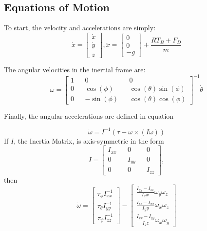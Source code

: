 \documentclass[12pt]{article}
\begin{document}
\subsection{Equations of Motion}
To start, the velocity and accelerations are simply:
\begin{equation}
\dot{x} = \begin{bmatrix} \dot{x}\\ \dot{y} \\ \dot{z} \end{bmatrix}, 
\ddot{x} =  \begin{bmatrix} 0\\0\\-g \end{bmatrix} + \frac{RT_{B} +F_{D}}{m}
\end{equation}

The angular velocities in the inertial frame are: 
\begin{equation}
\omega = \begin{bmatrix}
1 && 0 && 0 \\ 0 && \cos(\phi) && \cos(\theta)\sin(\phi) \\ 0 && -\sin(\phi) && \cos(\theta)\cos(\phi) \end{bmatrix}^{-1} \dot{\theta}
\end{equation}

Finally, the angular accelerations are defined in equation

\begin{equation}
\dot{\omega} = I^{-1}(\tau-\omega \times (I\omega))
\end{equation}
If $I$, the Inertia Matrix, is axis-symmetric in the form
\begin{equation*}
I = \begin{bmatrix} I_{xx} && 0 && 0 \\ 0 && I_{yy} && 0 \\ 0 && 0 && I_{zz} \end{bmatrix},
\end{equation*}
then 
\begin{equation*}
\dot{\omega} = \begin{bmatrix}
\tau_{\phi}I_{xx}^{-1} \\ \tau_{\theta}I_{yy}^{-1} \\ \tau_{\psi}I_{zz}^{-1}\end{bmatrix}
-\begin{bmatrix}
\frac{I_{yy}-I_{zz}}{I_xx}\omega_{y} \omega_{z} \\ 
\frac{I_{zz}-I_{xx}}{I_yy}\omega_{x} \omega_{z} \\ 
\frac{I_{xx}-I_{yy}}{I_zz}\omega_{x} \omega_{y}
\end{bmatrix}
\end{equation*}
\end{document}
